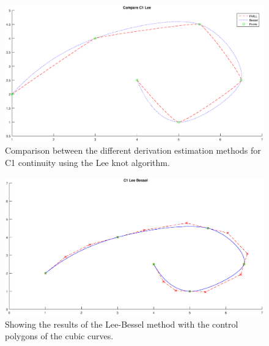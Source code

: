 \documentclass[12pt,a4paper]{article}
\begin{document}
\begin{figure}[hbtp]
\centering
\includegraphics[width=\textwidth]{compC1Lee.eps} 
\caption{Comparison between the different derivation estimation methods for C1 continuity using the Lee knot algorithm.}
\label{fig:compC1Lee}
\end{figure}

\begin{figure}[hbtp]
\centering
\includegraphics[width=\textwidth]{C1-LeeBessel.eps}
\caption{Showing the results of the Lee-Bessel method with the control polygons of the cubic curves.}
\label{fig:C1-LeeBessel}
\end{figure}
\end{document}
